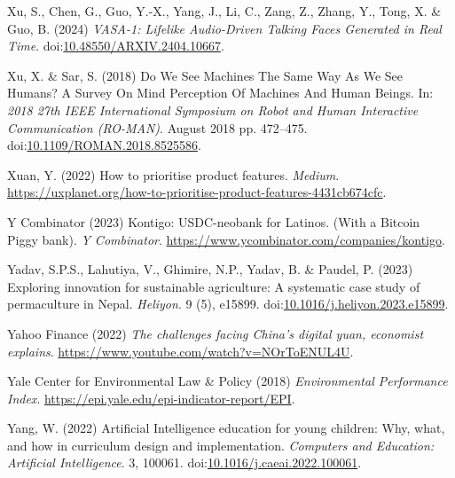 \documentclass[
  letterpaper,
  DIV=11,
  numbers=noendperiod]{scrartcl}
\newlength{\cslhangindent}
\newenvironment{CSLReferences}[2] %
 {\begin{list}{}{%
  \setlength{\itemindent}{0pt}
  \setlength{\leftmargin}{0pt}
  \setlength{\parsep}{0pt}
  \ifodd #1
   \setlength{\leftmargin}{\cslhangindent}
   \setlength{\itemindent}{-1\cslhangindent}
  \fi
  \setlength{\itemsep}{#2\baselineskip}}}
 {\end{list}}
\begin{document}
\begin{CSLReferences}{0}{1}
Xu, S., Chen, G., Guo, Y.-X., Yang, J., Li, C., Zang, Z., Zhang, Y.,
Tong, X. \& Guo, B. (2024) \emph{{VASA-1}: {Lifelike Audio-Driven
Talking Faces Generated} in {Real Time}}.
doi:\href{https://doi.org/10.48550/ARXIV.2404.10667}{10.48550/ARXIV.2404.10667}.

Xu, X. \& Sar, S. (2018) Do {We See Machines The Same Way As We See
Humans}? {A Survey On Mind Perception Of Machines And Human Beings}. In:
\emph{2018 27th {IEEE International Symposium} on {Robot} and {Human
Interactive Communication} ({RO-MAN})}. August 2018 pp. 472--475.
doi:\href{https://doi.org/10.1109/ROMAN.2018.8525586}{10.1109/ROMAN.2018.8525586}.

Xuan, Y. (2022) How to prioritise product features. \emph{Medium}.
\url{https://uxplanet.org/how-to-prioritise-product-features-4431cb674cfc}.

Y Combinator (2023) Kontigo: {USDC-neobank} for {Latinos}. ({With} a
{Bitcoin Piggy} bank). \emph{Y Combinator}.
\url{https://www.ycombinator.com/companies/kontigo}.

Yadav, S.P.S., Lahutiya, V., Ghimire, N.P., Yadav, B. \& Paudel, P.
(2023) Exploring innovation for sustainable agriculture: {A} systematic
case study of permaculture in {Nepal}. \emph{Heliyon}. 9 (5), e15899.
doi:\href{https://doi.org/10.1016/j.heliyon.2023.e15899}{10.1016/j.heliyon.2023.e15899}.

Yahoo Finance (2022) \emph{The challenges facing {China}'s digital yuan,
economist explains}. \url{https://www.youtube.com/watch?v=NOrToENUL4U}.

Yale Center for Environmental Law \& Policy (2018) \emph{Environmental
{Performance Index}}.
\url{https://epi.yale.edu/epi-indicator-report/EPI}.

Yang, W. (2022) Artificial {Intelligence} education for young children:
{Why}, what, and how in curriculum design and implementation.
\emph{Computers and Education: Artificial Intelligence}. 3, 100061.
doi:\href{https://doi.org/10.1016/j.caeai.2022.100061}{10.1016/j.caeai.2022.100061}.


\end{CSLReferences}
\end{document}
